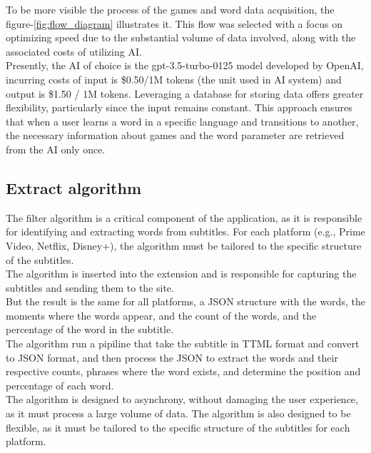 \documentclass[12pt]{article}
\begin{document}
To be more visible the process of the games and word data acquisition, the figure-\ref{fig:flow_diagram} illustrates it. This flow was selected with a focus on optimizing speed due to the substantial volume of data involved, along with the associated costs of utilizing AI. \\
Presently, the AI of choice is the gpt-3.5-turbo-0125 model developed by OpenAI, incurring costs of   input is \$0.50/1M tokens (the unit used in AI system) and output is  \$1.50 / 1M tokens. Leveraging a database for storing data offers greater flexibility, particularly since the input remains constant. This approach ensures that when a user learns a word in a specific language and transitions to another, the necessary information about games and the word parameter are retrieved from the AI only once. 
\subsection{Extract algorithm}
The filter algorithm is a critical component of the application, as it is responsible for identifying and extracting words from subtitles. For each platform (e.g., Prime Video, Netflix, Disney+), the algorithm must be tailored to the specific structure of the subtitles. \\
The algorithm is inserted into the extension and is responsible for capturing the subtitles and sending them to the site. \\
But the result is the same for all platforms, a JSON structure with the words, the moments where the words appear, and the count of the words, and the percentage of the word in the subtitle. \\
The algorithm run a pipiline that take the subtitle in TTML format and convert to JSON format, and then process the JSON to extract the words and their respective counts, phrases where the word exists, and determine the position and percentage of each word. \\
The algorithm is designed to asynchrony, without damaging the user experience, as it must process a large volume of data. The algorithm is also designed to be flexible, as it must be tailored to the specific structure of the subtitles for each platform. 
\end{document}
